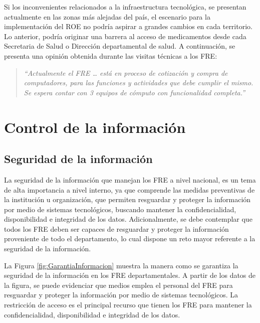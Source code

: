 \documentclass[
]{book}
\begin{document}
Si los inconvenientes relacionados a la infraestructura tecnológica, se presentan actualmente en las zonas más alejadas del país, el escenario para la implementación del ROE no podría aspirar a grandes cambios en cada territorio. Lo anterior, podría originar una barrera al acceso de medicamentos desde cada Secretaria de Salud o Dirección departamental de salud. A continuación, se presenta una opinión obtenida durante las visitas técnicas a los FRE:

\begin{quote}
\emph{``Actualmente el FRE \ldots{} está en proceso de cotización y compra de computadores, para las funciones y actividades que debe cumplir el mismo. Se espera contar con 3 equipos de cómputo con funcionalidad completa.''}
\end{quote}

\hypertarget{control-de-la-informaciuxf3n}{%
\section{Control de la información}\label{control-de-la-informaciuxf3n}}

\hypertarget{seguridad-de-la-informaciuxf3n}{%
\subsection{Seguridad de la información}\label{seguridad-de-la-informaciuxf3n}}

La seguridad de la información que manejan los FRE a nivel nacional, es un tema de alta importancia a nivel interno, ya que comprende las medidas preventivas de la institución u organización, que permiten resguardar y proteger la información por medio de sistemas tecnológicos, buscando mantener la confidencialidad, disponibilidad e integridad de los datos. Adicionalmente, se debe contemplar que todos los FRE deben ser capaces de resguardar y proteger la información proveniente de todo el departamento, lo cual dispone un reto mayor referente a la seguridad de la información.

La Figura \ref{fig:GarantiaInformacion} muestra la manera como se garantiza la seguridad de la información en los FRE departamentales. A partir de los datos de la figura, se puede evidenciar que medios emplea el personal del FRE para resguardar y proteger la información por medio de sistemas tecnológicos. La restricción de acceso es el principal recurso que tienen los FRE para mantener la confidencialidad, disponibilidad e integridad de los datos.
\end{document}
